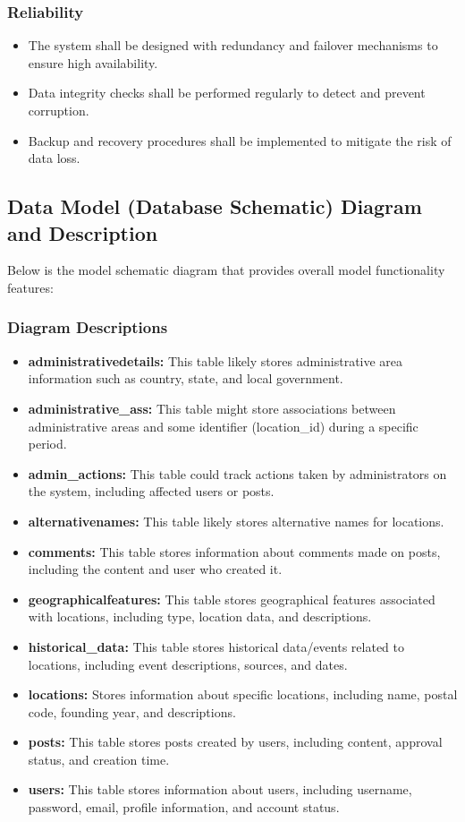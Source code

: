 \subsubsection{Reliability}
\begin{itemize}
    \item The system shall be designed with redundancy and failover mechanisms to ensure high availability.
    \item Data integrity checks shall be performed regularly to detect and prevent corruption.
    \item Backup and recovery procedures shall be implemented to mitigate the risk of data loss.
\end{itemize}

\subsection{Data Model (Database Schematic) Diagram and Description} 
Below is the model schematic diagram that provides overall model functionality features:

\subsubsection{Diagram Descriptions}
\begin{itemize}
    \item \textbf{administrativedetails:} This table likely stores administrative area information such as country, state, and local government.
    \item \textbf{administrative\_ass:} This table might store associations between administrative areas and some identifier (location\_id) during a specific period.
    \item \textbf{admin\_actions:} This table could track actions taken by administrators on the system, including affected users or posts.
    \item \textbf{alternativenames:} This table likely stores alternative names for locations.
    \item \textbf{comments:} This table stores information about comments made on posts, including the content and user who created it.
    \item \textbf{geographicalfeatures:} This table stores geographical features associated with locations, including type, location data, and descriptions.
    \item \textbf{historical\_data:} This table stores historical data/events related to locations, including event descriptions, sources, and dates.
    \item \textbf{locations:} Stores information about specific locations, including name, postal code, founding year, and descriptions.
    \item \textbf{posts:} This table stores posts created by users, including content, approval status, and creation time.
    \item \textbf{users:} This table stores information about users, including username, password, email, profile information, and account status.
\end{itemize}

